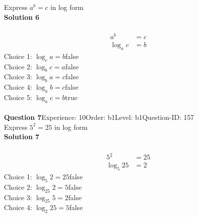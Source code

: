\documentclass{article}
\begin{document}
Express $a^b=c$ in log form\\[4pt]
\noindent\textbf{Solution 6}\\[2pt]
\\[-35pt]\begin{align*}
a^b&=c\\[2pt]
\log_ac&=b
\end{align*}
Choice 1: \hspace{20pt}$\log_ca=b$\hspace{20pt}false\\
Choice 2: \hspace{20pt}$\log_bc=a$\hspace{20pt}false\\
Choice 3: \hspace{20pt}$\log_ba=c$\hspace{20pt}false\\
Choice 4: \hspace{20pt}$\log_ab=c$\hspace{20pt}false\\
Choice 5: \hspace{20pt}$\log_ac=b$\hspace{20pt}true\\
\\[4pt]
\noindent\textbf{Question 7}\hspace{20pt}Experience: 10\hspace{20pt}Order: b1\hspace{20pt}Level: b1\hspace{20pt}Question-ID: 157\\[2pt]
Express $5^2=25$ in log form\\[4pt]
\noindent\textbf{Solution 7}\\[2pt]
\\[-35pt]\begin{align*}
5^2&=25\\[2pt]
\log_{5}25&=2
\end{align*}
Choice 1: \hspace{20pt}$\log_{5}2=25$\hspace{20pt}false\\
Choice 2: \hspace{20pt}$\log_{25}2=5$\hspace{20pt}false\\
Choice 3: \hspace{20pt}$\log_{25}5=2$\hspace{20pt}false\\
Choice 4: \hspace{20pt}$\log_{2}25=5$\hspace{20pt}false\\
\end{document}
